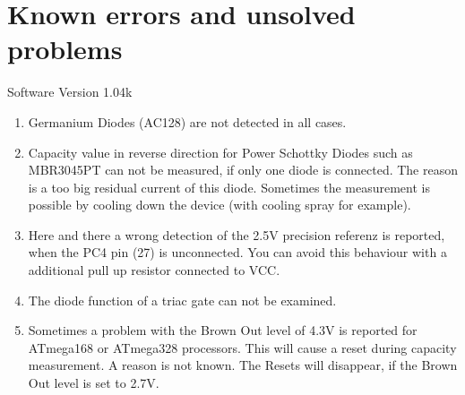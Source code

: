 
\chapter{Known errors and unsolved problems}
{\center Software Version 1.04k}

\begin{enumerate}

\item Germanium Diodes (AC128) are not detected in all cases.

\item Capacity value in reverse direction for Power Schottky Diodes such as MBR3045PT can not be measured,
if only one diode is connected. The reason is a too big residual current of this diode.
Sometimes the measurement is possible by cooling down the device (with  cooling spray for example).

\item Here and there  a wrong detection of the 2.5V precision referenz is reported, when the PC4 pin (27) is unconnected.
You can avoid this behaviour with a additional pull up resistor connected to VCC.
\item The diode function of a triac gate can not be examined.
\item Sometimes a problem with the Brown Out level of 4.3V is reported for ATmega168 or ATmega328 processors.
This will cause a reset during capacity measurement. A reason is not known.
The Resets will disappear, if the Brown Out level is set to 2.7V.

\end{enumerate}
